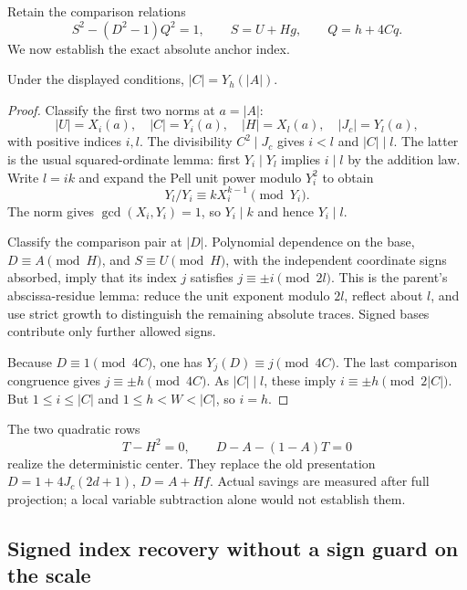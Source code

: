 Retain the comparison relations
\begin{equation}\label{eq:comparison314}
 S^2-(D^2-1)Q^2=1,
 \qquad S=U+Hg,
 \qquad Q=h+4Cq.
\end{equation}
We now establish the exact absolute anchor index.

\begin{lemma}\label{lem:anchor314}
Under the displayed conditions, $|C|=Y_h(|A|)$.
\end{lemma}
\begin{proof}
Classify the first two norms at $a=|A|$:
\[
 |U|=X_i(a),\quad |C|=Y_i(a),\quad
 |H|=X_l(a),\quad |J_c|=Y_l(a),
\]
with positive indices $i,l$. The divisibility $C^2\mid J_c$ gives
$i<l$ and $|C|\mid l$. The latter is the usual squared-ordinate lemma:
first $Y_i\mid Y_l$ implies $i\mid l$ by the addition law. Write
$l=ik$ and expand the Pell unit power modulo $Y_i^2$ to obtain
\[
 Y_l/Y_i\equiv kX_i^{k-1}\pmod{Y_i}.
\]
The norm gives $\gcd(X_i,Y_i)=1$, so $Y_i\mid k$ and hence $Y_i\mid l$.

Classify the comparison pair at $|D|$. Polynomial dependence on the
base, $D\equiv A\pmod H$, and $S\equiv U\pmod H$, with the independent
coordinate signs absorbed, imply that its index $j$ satisfies
$j\equiv\pm i\pmod{2l}$. This is the parent's abscissa-residue lemma:
reduce the unit exponent modulo $2l$, reflect about $l$, and use strict
growth to distinguish the remaining absolute traces. Signed bases
contribute only further allowed signs.

Because $D\equiv1\pmod{4C}$, one has $Y_j(D)\equiv j\pmod{4C}$.
The last comparison congruence gives $j\equiv\pm h\pmod{4C}$.
As $|C|\mid l$, these imply $i\equiv\pm h\pmod{2|C|}$. But
$1\le i\le|C|$ and $1\le h<W<|C|$, so $i=h$.
\end{proof}

The two quadratic rows
\[
 T-H^2=0,\qquad D-A-(1-A)T=0
\]
realize the deterministic center. They replace the old presentation
$D=1+4J_c(2d+1)$, $D=A+Hf$. Actual savings are measured after full
projection; a local variable subtraction alone would not establish them.

\subsection{Signed index recovery without a sign guard on the scale}

